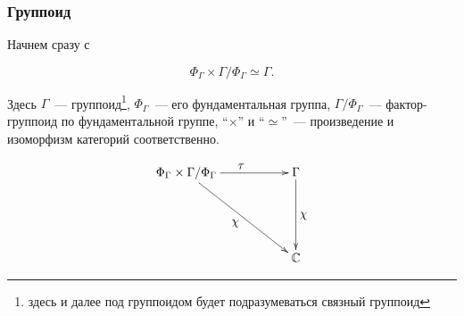 \subsubsection{Группоид}
    Начнем сразу с
    \begin{statement}
        \[\textstyle{\Phi_\Gamma \times \Gamma / \Phi_\Gamma \simeq \Gamma}.\]
    \end{statement}
    Здесь $\Gamma$~--- группоид\footnote{здесь и далее под группоидом будет 
    подразумеваться связный группоид}, $\Phi_\Gamma$~--- его фундаментальная 
    группа, $\Gamma / \Phi_\Gamma$~--- фактор-группоид по фундаментальной 
    группе, ``$\times$'' и ``$\simeq$''~--- произведение и изоморфизм категорий 
    соответственно.

    \begin{statement}
    \end{statement}

    \begin{figure}[h]
        \centering
        \[\xymatrix{
            \Phi_\Gamma \times \Gamma / \Phi_\Gamma \ar[rr]^{\textstyle{\tau}} \ar[rrdd]_{\textstyle{\chi}}    & & \Gamma\ar[dd]^{\textstyle{\chi}}    \\
                                                                                                                    & &                                     \\
                                                                                                                    & & \mathbb{C}
        }\]
        \caption{}
        \label{cd_groupoidchar}
    \end{figure}